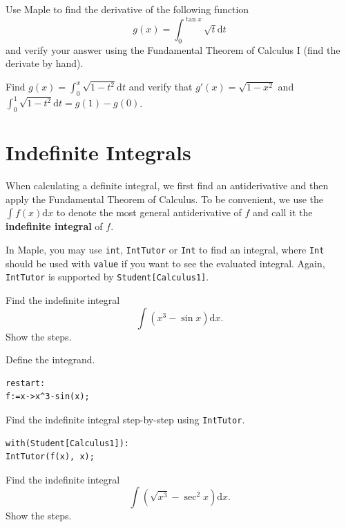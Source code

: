 \documentclass[en,11pt,simple]{elegantbook}
\let\BeginKnitrBlock\begin \let\EndKnitrBlock\end
\begin{document}
\BeginKnitrBlock{exercise}{}{}
\protect\hypertarget{exr:unnamed-chunk-142}{}{\label{exr:unnamed-chunk-142} }
Use Maple to find the derivative of the following function
\[
g(x)=\int_0^{\tan x}\sqrt{t}\mathrm{d} t
\]
and verify your answer using the Fundamental Theorem of Calculus I (find the derivate by hand).
\EndKnitrBlock{exercise}

\BeginKnitrBlock{exercise}{}{}
\protect\hypertarget{exr:unnamed-chunk-143}{}{\label{exr:unnamed-chunk-143} }
Find \(g(x)=\displaystyle\int_0^x\sqrt{1-t^2}\mathrm{d} t\) and verify that \(g'(x)=\sqrt{1-x^2}\) and \(\displaystyle\int_0^1\sqrt{1-t^2}\mathrm{d} t=g(1)-g(0)\).
\EndKnitrBlock{exercise}

\hypertarget{indefinite-integrals}{%
\section{Indefinite Integrals}\label{indefinite-integrals}}

When calculating a definite integral, we first find an antiderivative and then apply the Fundamental Theorem of Calculus. To be convenient, we use the \(\int f(x)\mathrm{d}x\) to denote the most general antiderivative of \(f\) and call it the \textbf{indefinite integral} of \(f\).

In Maple, you may use \texttt{int}, \texttt{IntTutor} or \texttt{Int} to find an integral, where \texttt{Int} should be used with \texttt{value} if you want to see the evaluated integral.
Again, \texttt{IntTutor} is supported by \texttt{Student{[}Calculus1{]}}.

\BeginKnitrBlock{example}{}{}
\protect\hypertarget{exm:unnamed-chunk-144}{}{\label{exm:unnamed-chunk-144} }
Find the indefinite integral
\[
\int(x^3-\sin x)\mathrm{d} x.
\]
Show the steps.
\EndKnitrBlock{example}

\BeginKnitrBlock{solution}{}{}
{}
Define the integrand.

\begin{verbatim}
restart:
f:=x->x^3-sin(x);
\end{verbatim}

Find the indefinite integral step-by-step using \texttt{IntTutor}.

\begin{verbatim}
with(Student[Calculus1]):
IntTutor(f(x), x);
\end{verbatim}
\EndKnitrBlock{solution}

\BeginKnitrBlock{exercise}{}{}
\protect\hypertarget{exr:unnamed-chunk-146}{}{\label{exr:unnamed-chunk-146} }
Find the indefinite integral
\[
\int(\sqrt{x^3}-\sec^2x)\mathrm{d} x.
\]
Show the steps.
\EndKnitrBlock{exercise}
\end{document}
